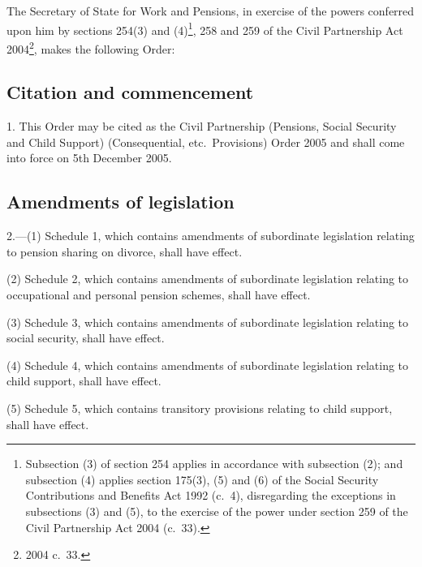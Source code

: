 \documentclass[12pt,a4paper]{article}
\title{\regstitle}
\author{S.I.\ 2005 No.\ 2877}
\date{Made
13th October 2005\\
Laid before Parliament
20th October 2005\\
Coming into force
5th December 2005
}
\begin{document}
\maketitle

\noindent
The Secretary of State for Work and Pensions, in exercise of the powers conferred upon him by sections 254(3) and (4)\footnote{Subsection (3) of section 254 applies in accordance with subsection (2); and subsection (4) applies section 175(3), (5) and (6) of the Social Security Contributions and Benefits Act 1992 (c.\ 4), disregarding the exceptions in subsections (3) and (5), to the exercise of the power under section 259 of the Civil Partnership Act 2004 (c.\ 33).}, 258 and 259 of the Civil Partnership Act 2004\footnote{2004 c.\ 33.}, makes the following Order: 

{\sloppy

\tableofcontents

}

\bigskip

\setcounter{secnumdepth}{-2}

\subsection[1. Citation and commencement]{Citation and commencement}

1.  This Order may be cited as the Civil Partnership (Pensions, Social Security and Child Support) (Consequential, etc.\ Provisions) Order 2005 and shall come into force on 5th December 2005.

\subsection[2. Amendments of legislation]{Amendments of legislation}

2.---(1)  Schedule 1, which contains amendments of subordinate legislation relating to pension sharing on divorce, shall have effect.

(2) Schedule 2, which contains amendments of subordinate legislation relating to occupational and personal pension schemes, shall have effect.

(3) Schedule 3, which contains amendments of subordinate legislation relating to social security, shall have effect.

(4) Schedule 4, which contains amendments of subordinate legislation relating to child support, shall have effect.

(5) Schedule 5, which contains transitory provisions relating to child support, shall have effect.
\end{document}
